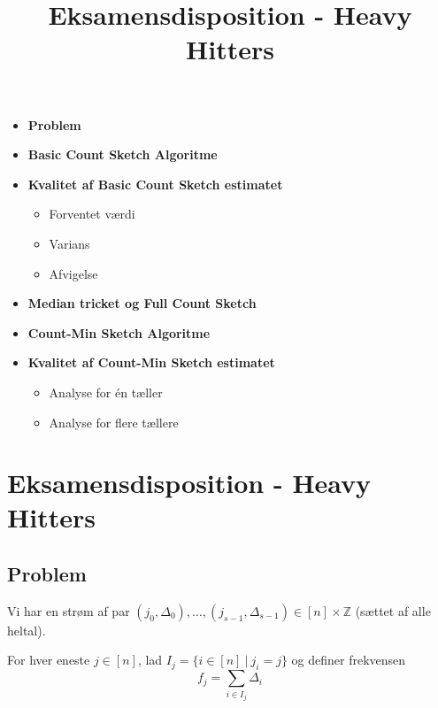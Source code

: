 
\title{Eksamensdisposition - Heavy Hitters}


\maketitle

\begin{itemize}
  \item \textbf{Problem}
  \item \textbf{Basic Count Sketch Algoritme}
  \item \textbf{Kvalitet af Basic Count Sketch estimatet}
  \begin{itemize}
    \item Forventet værdi
    \item Varians
    \item Afvigelse
  \end{itemize}
  \item \textbf{Median tricket og Full Count Sketch}
  \item \textbf{Count-Min Sketch Algoritme}
  \item \textbf{Kvalitet af Count-Min Sketch estimatet}
  \begin{itemize}
    \item Analyse for én tæller
    \item Analyse for flere tællere
  \end{itemize}
\end{itemize}


\newpage
\section{Eksamensdisposition - Heavy Hitters}

\subsection{Problem}

Vi har en strøm af par $(j_0, \Delta_0), \dots, (j_{s-1}, \Delta_{s-1}) \in [n]\times \mathbb Z$ (sættet af alle heltal).

For hver eneste $j \in [n]$, lad $I_j = \{ i \in [n] \ | \ j_i = j \}$ og definer frekvensen
$$
f_j = \sum_{i \in I_j} \Delta_i
$$

